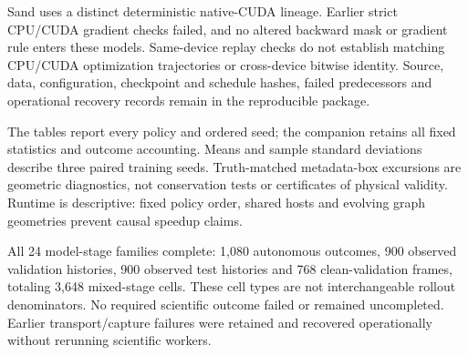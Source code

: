 Sand uses a distinct deterministic native-CUDA lineage. Earlier strict CPU/CUDA gradient checks failed, and no altered backward mask or gradient rule enters these models. Same-device replay checks do not establish matching CPU/CUDA optimization trajectories or cross-device bitwise identity. Source, data, configuration, checkpoint and schedule hashes, failed predecessors and operational recovery records remain in the reproducible package.

The tables report every policy and ordered seed; the companion retains all fixed statistics and outcome accounting. Means and sample standard deviations describe three paired training seeds. Truth-matched metadata-box excursions are geometric diagnostics, not conservation tests or certificates of physical validity. Runtime is descriptive: fixed policy order, shared hosts and evolving graph geometries prevent causal speedup claims.

All 24 model-stage families complete: 1,080 autonomous outcomes, 900 observed validation histories, 900 observed test histories and 768 clean-validation frames, totaling 3,648 mixed-stage cells. These cell types are not interchangeable rollout denominators. No required scientific outcome failed or remained uncompleted. Earlier transport/capture failures were retained and recovered operationally without rerunning scientific workers.

